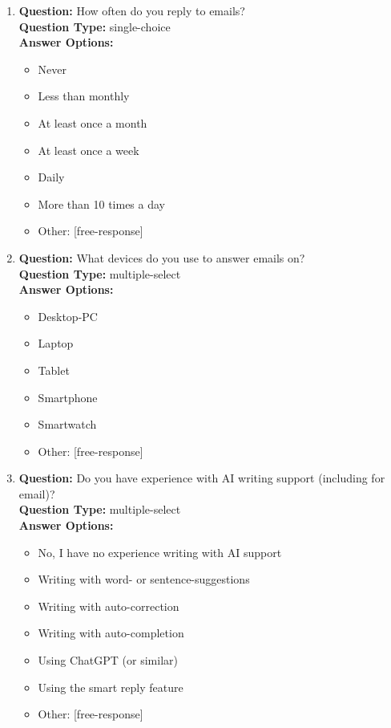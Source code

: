 \begin{enumerate}
\item
  \textbf{Question:} How often do you reply to emails? \\
  \textbf{Question Type:} single-choice \\
  \textbf{Answer Options:}
  \begin{itemize}
    \item Never
    \item Less than monthly
    \item At least once a month
    \item At least once a week
    \item Daily
    \item More than 10 times a day
    \item Other: [free-response]
  \end{itemize}

\item
  \textbf{Question:} What devices do you use to answer emails on? \\
  \textbf{Question Type:} multiple-select \\
  \textbf{Answer Options:}
  \begin{itemize}
    \item Desktop-PC
    \item Laptop
    \item Tablet
    \item Smartphone
    \item Smartwatch
    \item Other: [free-response]
  \end{itemize}

\item
  \textbf{Question:} Do you have experience with AI writing support (including for email)? \\
  \textbf{Question Type:} multiple-select \\
  \textbf{Answer Options:}
  \begin{itemize}
    \item No, I have no experience writing with AI support
    \item Writing with word- or sentence-suggestions
    \item Writing with auto-correction
    \item Writing with auto-completion
    \item Using ChatGPT (or similar)
    \item Using the smart reply feature
    \item Other: [free-response]
  \end{itemize}


\end{enumerate}
